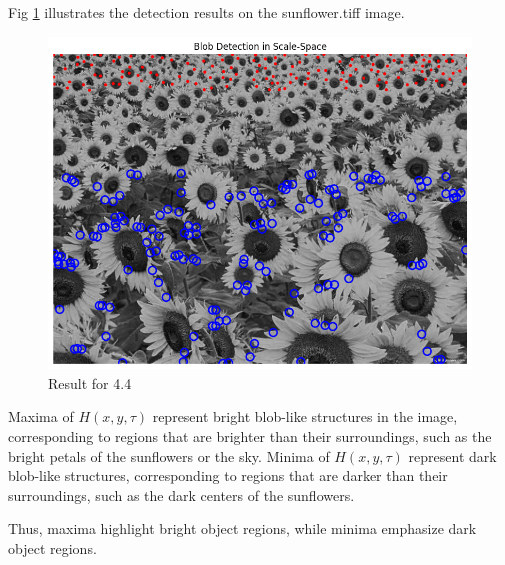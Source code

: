 \documentclass[12pt]{article}
\begin{document}
Fig \ref{fig:4.4} illustrates the detection results on the sunflower.tiff image.


\FloatBarrier

\begin{figure}[h]
    \centering
    \includegraphics[width=0.7\columnwidth, keepaspectratio]{pics/a5-4.4.png}
    \caption[]{Result for 4.4}
    \label{fig:4.4}
\end{figure}

\FloatBarrier

Maxima of \( H(x,y,\tau) \) represent bright blob-like structures in the image, corresponding to regions that are brighter than their surroundings, such as the bright petals of the sunflowers or the sky. Minima of \( H(x,y,\tau) \) represent dark blob-like structures, corresponding to regions that are darker than their surroundings, such as the dark centers of the sunflowers.

Thus, maxima highlight bright object regions, while minima emphasize dark object regions.
\end{document}
